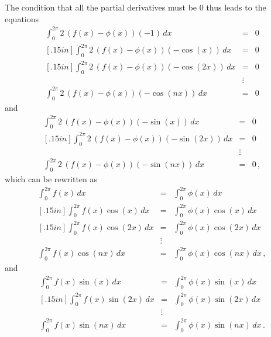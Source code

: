 {{{{The condition 
that all the partial derivatives must be 0 thus leads to the equations
\begin{eqnarray*}
\int_0^{2\pi}2\,\left( f(x) - \phi(x)\right)(-1) \, dx &=&0 \\ [.15in]
\int_0^{2\pi}2\,\left( f(x) - \phi(x)\right)(-\cos(x)) \, dx &=&0 \\ [.15in]
\int_0^{2\pi}2\,\left( f(x) - \phi(x)\right)(-\cos(2x)) \, dx &=&0 \\
&\vdots & \\
\int_0^{2\pi}2\,\left( f(x) - \phi(x)\right)(-\cos(nx)) \, dx &=&0 
\end{eqnarray*}
and
\begin{eqnarray*}
\int_0^{2\pi}2\,\left( f(x) - \phi(x)\right)(-\sin(x)) \, dx &=&0 \\ [.15in]
\int_0^{2\pi}2\,\left( f(x) - \phi(x)\right)(-\sin(2x)) \, dx &=&0 \\
&\vdots & \\
\int_0^{2\pi}2\,\left( f(x) - \phi(x)\right)(-\sin(nx)) \, dx &=&0 \, ,
\end{eqnarray*}
which can be rewritten as
\begin{eqnarray*}
\int_0^{2\pi}f(x) \, dx&=&\int_0^{2\pi}\phi(x)\, dx  \\ [.15in]
\int_0^{2\pi}f(x)\cos(x) \, dx&=&\int_0^{2\pi}\phi(x)\cos(x)\, dx  \\ [.15in]
\int_0^{2\pi}f(x)\cos(2x) \, dx&=&\int_0^{2\pi}\phi(x)\cos(2x)\, dx  \\
&\vdots & \\
\int_0^{2\pi}f(x)\cos(nx) \, dx&=&\int_0^{2\pi}\phi(x)\cos(nx)\, dx  \, ,
\end{eqnarray*}
and
\begin{eqnarray*}
\int_0^{2\pi}f(x)\sin(x) \, dx&=&\int_0^{2\pi}\phi(x)\sin(x)\, dx  \\ [.15in]
\int_0^{2\pi}f(x)\sin(2x) \, dx&=&\int_0^{2\pi}\phi(x)\sin(2x)\, dx  \\
&\vdots & \\
\int_0^{2\pi}f(x)\sin(nx) \, dx&=&\int_0^{2\pi}\phi(x)\sin(nx)\, dx  \, .
\end{eqnarray*}

}}}}
